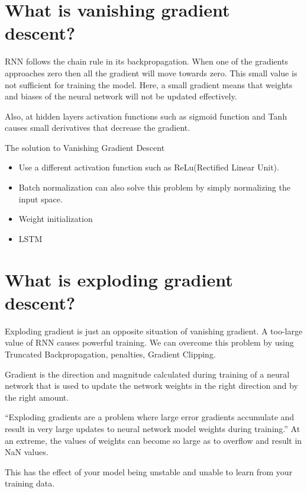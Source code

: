 \documentclass[
]{book}
\begin{document}
\hypertarget{what-is-vanishing-gradient-descent}{%
\section{What is vanishing gradient descent?}\label{what-is-vanishing-gradient-descent}}

RNN follows the chain rule in its backpropagation. When one of the gradients approaches zero then all the gradient will move towards zero. This small value is not sufficient for training the model. Here, a small gradient means that weights and biases of the neural network will not be updated effectively.

Also, at hidden layers activation functions such as sigmoid function and Tanh causes small derivatives that decrease the gradient.

The solution to Vanishing Gradient Descent

\begin{itemize}
\item
  Use a different activation function such as ReLu(Rectified Linear Unit).
\item
  Batch normalization can also solve this problem by simply normalizing the input space.
\item
  Weight initialization
\item
  LSTM
\end{itemize}

\hypertarget{what-is-exploding-gradient-descent}{%
\section{What is exploding gradient descent?}\label{what-is-exploding-gradient-descent}}

Exploding gradient is just an opposite situation of vanishing gradient. A too-large value of RNN causes powerful training. We can overcome this problem by using Truncated Backpropagation, penalties, Gradient Clipping.

Gradient is the direction and magnitude calculated during training of a neural network that is used to update the network weights in the right direction and by the right amount.

``Exploding gradients are a problem where large error gradients accumulate and result in very large updates to neural network model weights during training.'' At an extreme, the values of weights can become so large as to overflow and result in NaN values.

This has the effect of your model being unstable and unable to learn from your training data.
\end{document}
